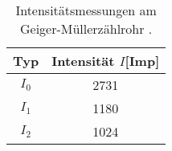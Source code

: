 \begin{table}
\centering
\caption{Intensitätsmessungen am Geiger-Müllerzählrohr \cite{hinweis}.}
\label{tab:idky}
\begin{tabular}{c c}
    \toprule
    Typ & Intensität $I$[Imp] \\
    \midrule
    $I_{0}$  &   2731   \\
$I_{1}$  &   1180   \\
    $I_{2}$  &   1024   \\
    \bottomrule
\end{tabular}
\end{table}
